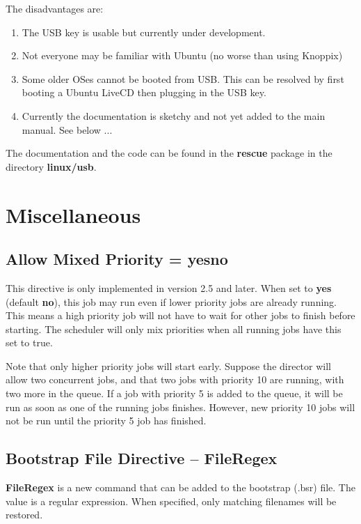 The disadvantages are:
\begin{enumerate}
\item The USB key is usable but currently under development.
\item Not everyone may be familiar with Ubuntu (no worse
  than using Knoppix)
\item Some older OSes cannot be booted from USB. This can
   be resolved by first booting a Ubuntu LiveCD then plugging
   in the USB key.
\item Currently the documentation is sketchy and not yet added
   to the main manual. See below ...
\end{enumerate}

The documentation and the code can be found in the {\bf rescue} package
in the directory {\bf linux/usb}.

\section{Miscellaneous}

\subsection{Allow Mixed Priority = \lt{}yes\vb{}no\gt{}}
   This directive is only implemented in version 2.5 and later.  When
   set to {\bf yes} (default {\bf no}), this job may run even if lower
   priority jobs are already running.  This means a high priority job
   will not have to wait for other jobs to finish before starting.
   The scheduler will only mix priorities when all running jobs have
   this set to true.

   Note that only higher priority jobs will start early.  Suppose the
   director will allow two concurrent jobs, and that two jobs with
   priority 10 are running, with two more in the queue.  If a job with
   priority 5 is added to the queue, it will be run as soon as one of
   the running jobs finishes.  However, new priority 10 jobs will not
   be run until the priority 5 job has finished.

\subsection{Bootstrap File Directive -- FileRegex}
  {\bf FileRegex} is a new command that can be added to the bootstrap
  (.bsr) file.  The value is a regular expression.  When specified, only
  matching filenames will be restored.

